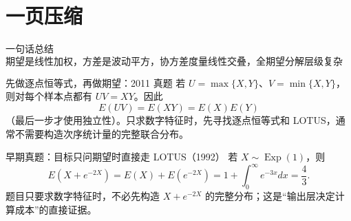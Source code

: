 \documentclass[11pt,a4paper]{ctexart}
\begin{document}
\section{一页压缩}

\begin{corebox}{一句话总结}
\[
\boxed{\text{期望是线性加权，方差是波动平方，协方差度量线性交叠，全期望分解层级复杂性。}}
\]
\end{corebox}

\begin{examplebox}{先做逐点恒等式，再做期望：2011 真题}
若 $U=\max\{X,Y\}$、$V=\min\{X,Y\}$，则对每个样本点都有 $UV=XY$。因此
\[
E(UV)=E(XY)=E(X)E(Y)
\]
（最后一步才使用独立性）。只求数字特征时，先寻找逐点恒等式和 LOTUS，通常不需要构造次序统计量的完整联合分布。
\end{examplebox}

\begin{examplebox}{早期真题：目标只问期望时直接走 LOTUS（1992）}
若 $X\sim\operatorname{Exp}(1)$，则
\[
E(X+e^{-2X})=E(X)+E(e^{-2X})=1+\int_0^\infty e^{-3x}dx=\frac43.
\]
题目只要求数字特征时，不必先构造 $X+e^{-2X}$ 的完整分布；这是“输出层决定计算成本”的直接证据。
\end{examplebox}
\end{document}
